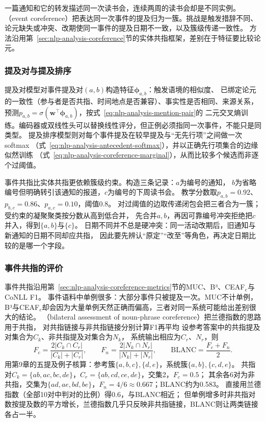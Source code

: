 一篇通知和它的转发描述同一次读书会，连续两周的读书会却是不同实例。
（event coreference）把表达同一次事件的提及归为一簇。挑战是触发措辞不同、
论元缺失或冲突、改期使同一事件的提及日期不一致，以及簇级传递一致性。
方法沿用第~\ref{sec:nlp-analysis-coreference}节的实体共指框架，差别在于特征要比较论元。

\subsubsection{提及对与提及排序}
\label{sec:nlp-extraction-event-coref-models}

提及对模型对事件提及对$(a,b)$构造特征$\bm{\phi}_{a,b}$：触发语境的相似度、
已绑定论元的一致性（参与者是否共指、时间地点是否兼容）、事实性是否相同、来源关系，
预测$p_{a,b}=\sigma(\bm{w}^{\top}\bm{\phi}_{a,b})$，按式~\eqref{eq:nlp-analysis-mention-pair}的
二元交叉熵训练。编码器或双线性头可以替换线性评分，但正例必须指同一次事件，不能只是同类型。
提及排序模型则对每个事件提及在较早提及与“无先行项”之间做一次softmax
（式~\eqref{eq:nlp-analysis-antecedent-softmax}），并以正确先行项集合的边缘似然训练
（式~\eqref{eq:nlp-analysis-coreference-marginal}），从而比较多个候选而非逐个过阈值。

事件共指比实体共指更依赖簇级约束。构造三条记录：$a$为编号的通知，
$b$为省略编号但明确转引该通知的报道，$c$为编号的下周读书会。
教学分数取$p_{a,b}=0.92$、$p_{b,c}=0.86$、$p_{a,c}=0.10$，阈值0.8。
对过阈值的边取传递闭包会把三者合为一簇；受约束的凝聚聚类按分数从高到低合并，
先合并$a,b$，再因可靠编号冲突拒绝把$c$并入，得到$\{a,b\}$与$\{c\}$。
日期不同并不总是硬冲突：同一活动改期后，旧通知与新通知的日期不同却应共指，
因此要先辨认“原定”“改至”等角色，再决定日期比较的是哪一个字段。

\subsubsection{事件共指的评价}
\label{sec:nlp-extraction-event-coref-metrics}

事件共指沿用第~\ref{sec:nlp-analysis-coreference-metrics}节的MUC、B³、CEAF$_e$与CoNLL F1。
事件语料中单例很多：大部分事件只被提及一次。MUC不计单例，
B³与CEAF$_e$却会因为大量单例天然正确而偏高，三者对同一系统可能给出差别很大的结论。
（bilateral assessment of noun-phrase coreference）把兰德指数的思路用于共指，
对共指链接与非共指链接分别计算F1再平均
设参考答案中的共指提及对集合为$C_k$、非共指提及对集合为$N_k$，
系统输出相应为$C_r$、$N_r$，则
\begin{equation}
  F_c=\frac{2|C_k\cap C_r|}{|C_k|+|C_r|},\qquad
  F_n=\frac{2|N_k\cap N_r|}{|N_k|+|N_r|},\qquad
  \mathrm{BLANC}=\frac{F_c+F_n}{2}.
  \label{eq:nlp-extraction-blanc}
\end{equation}
用第9章的五提及例子核算：参考簇$\{a,b,c\},\{d,e\}$，系统簇$\{a,b\},\{c,d,e\}$。
共指对$C_k=\{ab,ac,bc,de\}$，$C_r=\{ab,cd,ce,de\}$，交集2，$F_c=0.5$；
其余各6对为非共指，交集为$\{ad,ae,bd,be\}$，$F_n=4/6\approx0.667$；BLANC约为0.583。
直接用兰德指数（全部10对中判对的比例）得0.6，与BLANC相近；
但单例增多时非共指对数按提及数的平方增长，兰德指数几乎只反映非共指链接，BLANC则让两类链接各占一半。
